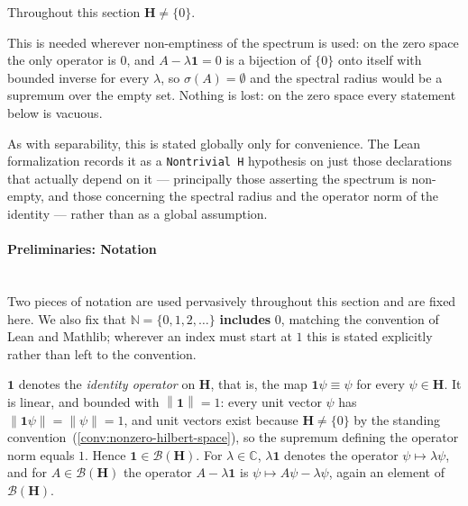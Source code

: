 \begin{convention}
    \label{conv:nonzero-hilbert-space}
    Throughout this section $\mathbf{H} \ne \{0\}$.

    This is needed wherever non-emptiness of the spectrum is used: on the zero space the only operator is $0$, and $A - \lambda\mathbf{1} = 0$ is a bijection of $\{0\}$ onto itself with bounded inverse for every $\lambda$, so $\sigma(A) = \emptyset$ and the spectral radius would be a supremum over the empty set. Nothing is lost: on the zero space every statement below is vacuous.

    As with separability, this is stated globally only for convenience. The Lean formalization records it as a \texttt{Nontrivial H} hypothesis on just those declarations that actually depend on it — principally those asserting the spectrum is non-empty, and those concerning the spectral radius and the operator norm of the identity — rather than as a global assumption.
\end{convention}

\paragraph{Preliminaries: Notation}\mbox{}\\
Two pieces of notation are used pervasively throughout this section and are fixed here. We also fix that $\mathbb{N} = \{0, 1, 2, \ldots\}$ \textbf{includes} $0$, matching the convention of Lean and Mathlib; wherever an index must start at $1$ this is stated explicitly rather than left to the convention.

\begin{definition}
    \label{def:identity-operator}
    \leanok
    $\mathbf{1}$ denotes the \textit{identity operator} on $\mathbf{H}$, that is, the map $\mathbf{1}\psi \equiv \psi$ for every $\psi \in \mathbf{H}$. It is linear, and bounded with $\left\| \mathbf{1} \right\| = 1$: every unit vector $\psi$ has $\left\| \mathbf{1}\psi \right\| = \left\| \psi \right\| = 1$, and unit vectors exist because $\mathbf{H} \ne \{0\}$ by the standing convention~(\ref{conv:nonzero-hilbert-space}), so the supremum defining the operator norm equals $1$. Hence $\mathbf{1} \in \mathcal{B}(\mathbf{H})$. For $\lambda \in \mathbb{C}$, $\lambda\mathbf{1}$ denotes the operator $\psi \mapsto \lambda\psi$, and for $A \in \mathcal{B}(\mathbf{H})$ the operator $A - \lambda\mathbf{1}$ is $\psi \mapsto A\psi - \lambda\psi$, again an element of $\mathcal{B}(\mathbf{H})$.
\end{definition}

